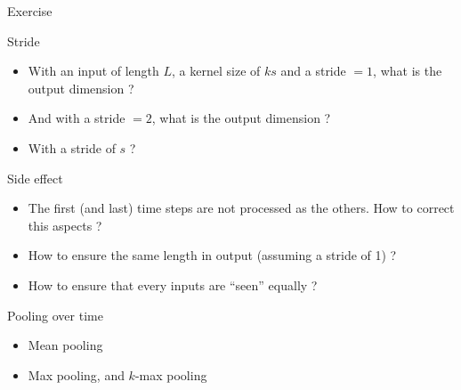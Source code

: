 \begin{frame}{Exercise}
  \begin{block}{Stride}
    \begin{itemize}
    \item With an input of length $L$, a kernel size of $ks$ and a stride $=1$, what is the output dimension ?
    \item And with a stride $=2$, what is the output dimension ?
    \item With a stride of $s$ ? 
    \end{itemize}
  \end{block}
  \begin{block}{Side effect}
    \begin{itemize}
    \item The first (and last) time steps are not processed as the others. How to correct this aspects ?
    \item How to ensure the same length in output (assuming a stride of 1)  ?
    \item How to ensure that every  inputs are ``seen'' equally ?
    \end{itemize}
  \end{block}
\end{frame}


\begin{frame}{Pooling over time}
    \begin{center}
  \end{center}
  \begin{itemize}
  \item Mean pooling
  \item Max pooling, and $k$-max pooling
  \end{itemize}
\end{frame}

